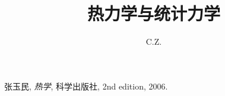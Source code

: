 \documentclass{ctexart}
\title{热力学与统计力学}
\author{C.Z.}
\begin{document}
\maketitle
\tableofcontents













\begin{thebibliography}{9}
 	张玉民,
	\textit{热学},
	科学出版社,
	2nd edition,
	2006.
\end{thebibliography}
\end{document}
